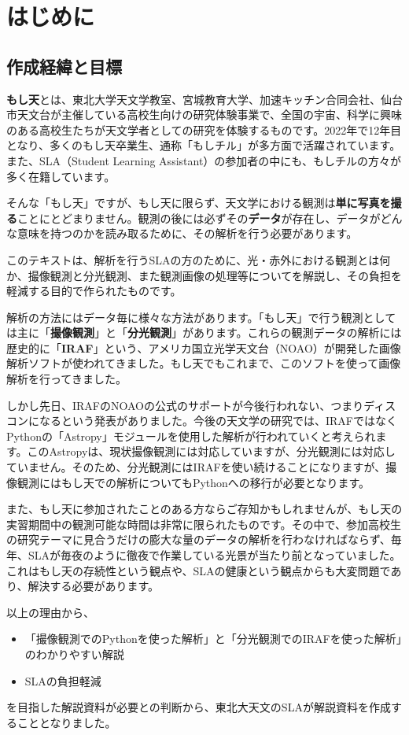 \chapter{はじめに} %
\label{chap:introduction}

\section{作成経緯と目標} %
\label{sect:text_goal}
\textbf{もし天}とは、東北大学天文学教室、宮城教育大学、加速キッチン合同会社、仙台市天文台が主催している高校生向けの研究体験事業で、全国の宇宙、科学に興味のある高校生たちが天文学者としての研究を体験するものです。2022年で12年目となり、多くのもし天卒業生、通称「もしチル」が多方面で活躍されています。また、SLA（Student Learning Assistant）の参加者の中にも、もしチルの方々が多く在籍しています。\par
そんな「もし天」ですが、もし天に限らず、天文学における観測は\textbf{単に写真を撮る}ことにとどまりません。観測の後には必ずその\textbf{データ}が存在し、データがどんな意味を持つのかを読み取るために、その解析を行う必要があります。\par
このテキストは、解析を行うSLAの方のために、光・赤外における観測とは何か、撮像観測と分光観測、また観測画像の処理等についてを解説し、その負担を軽減する目的で作られたものです。\par
解析の方法にはデータ毎に様々な方法があります。「もし天」で行う観測としては主に「\textbf{撮像観測}」と「\textbf{分光観測}」があります。これらの観測データの解析には歴史的に「\textbf{IRAF}」\cite{iraf}という、アメリカ国立光学天文台（NOAO）が開発した画像解析ソフトが使われてきました。もし天でもこれまで、このソフトを使って画像解析を行ってきました。\par
しかし先日、IRAFのNOAOの公式のサポートが今後行われない、つまりディスコンになるという発表がありました。今後の天文学の研究では、IRAFではなくPythonの「Astropy」モジュールを使用した解析が行われていくと考えられます。このAstropyは、現状撮像観測には対応していますが、分光観測には対応していません。そのため、分光観測にはIRAFを使い続けることになりますが、撮像観測にはもし天での解析についてもPythonへの移行が必要となります。\par
また、もし天に参加されたことのある方ならご存知かもしれませんが、もし天の実習期間中の観測可能な時間は非常に限られたものです。その中で、参加高校生の研究テーマに見合うだけの膨大な量のデータの解析を行わなければならず、毎年、SLAが毎夜のように徹夜で作業している光景が当たり前となっていました。これはもし天の存続性という観点や、SLAの健康という観点からも大変問題であり、解決する必要があります。\par
以上の理由から、
\begin{itemize}
    \item 「撮像観測でのPythonを使った解析」と「分光観測でのIRAFを使った解析」のわかりやすい解説
    \item SLAの負担軽減
\end{itemize}
を目指した解説資料が必要との判断から、東北大天文のSLAが解説資料を作成することとなりました。

